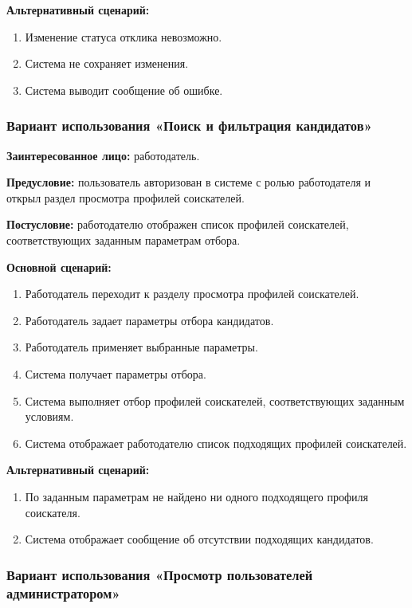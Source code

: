 \textbf{Альтернативный сценарий:}
\begin{enumerate}
	\item Изменение статуса отклика невозможно.
	\item Система не сохраняет изменения.
	\item Система выводит сообщение об ошибке.
\end{enumerate}

\subsubsection{Вариант использования «Поиск и фильтрация кандидатов»}

\textbf{Заинтересованное лицо:} работодатель.

\textbf{Предусловие:} пользователь авторизован в системе с ролью работодателя и открыл раздел просмотра профилей соискателей.

\textbf{Постусловие:} работодателю отображен список профилей соискателей, соответствующих заданным параметрам отбора.

\textbf{Основной сценарий:}
\begin{enumerate}
	\item Работодатель переходит к разделу просмотра профилей соискателей.
	\item Работодатель задает параметры отбора кандидатов.
	\item Работодатель применяет выбранные параметры.
	\item Система получает параметры отбора.
	\item Система выполняет отбор профилей соискателей, соответствующих заданным условиям.
	\item Система отображает работодателю список подходящих профилей соискателей.
\end{enumerate}

\textbf{Альтернативный сценарий:}
\begin{enumerate}
	\item По заданным параметрам не найдено ни одного подходящего профиля соискателя.
	\item Система отображает сообщение об отсутствии подходящих кандидатов.
\end{enumerate}

\subsubsection{Вариант использования «Просмотр пользователей администратором»}

